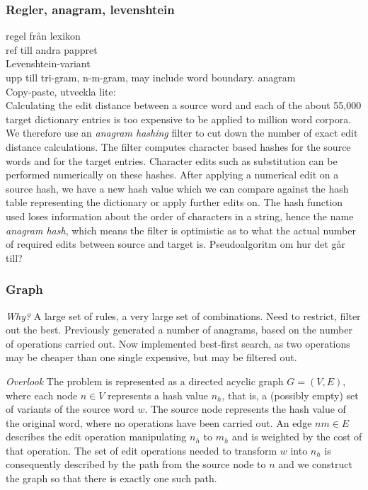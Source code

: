 \documentclass[10pt,a5paper,twoside]{article}
\begin{document}
\subsubsection{Regler, anagram, levenshtein}
regel från lexikon \\
ref till andra pappret\\
Levenshtein-variant\\
upp till tri-gram, n-m-gram, may include word boundary.
anagram\\
Copy-paste, utveckla lite:\\
Calculating the edit distance between a source word and each of the
about 55,000 target dictionary entries is too expensive
to be applied to million word corpora. We therefore
use an \textit{anagram hashing} filter \cite{Reynaert2010} to
cut down the number of exact edit distance calculations.  The filter
computes character based hashes for the source words and for the target
entries. Character edits such as substitution can be performed
numerically on these hashes. After applying a numerical edit on a
source hash, we have a new hash value which we can compare against the
hash table representing the dictionary or apply further edits on. The
hash function used loses information about the order of characters in
a string, hence the name \textit{anagram hash}, which means the filter
is optimistic as to what the actual number of required edits between
source and target is.
Pseudoalgoritm om hur det går till?

\subsubsection{Graph}
\textit{Why?}
A large set of rules, a very large set of combinations. Need to restrict, filter
out the best. Previously generated a number of anagrams, based on the number of
operations carried out. Now implemented best-first search, as two operations may
be cheaper than one single expensive, but may be filtered out.

\textit{Overlook}
The problem is represented as a directed acyclic graph $G = (V,E)$, where each
node $n \in V$ represents a hash value $n_h$, that is, a (possibly empty) set of variants
of the source word $w$.
The source node represents the hash value of the original word, where no
operations have been carried out.
An edge $nm \in E$ describes the edit operation manipulating $n_h$ to $m_h$
and is weighted by the cost of that operation.
The set of edit operations needed to transform $w$ into $n_h$ is consequently %
described by the path from the source node to $n$ and we construct the
graph so that there is exactly one such path.
\end{document}

